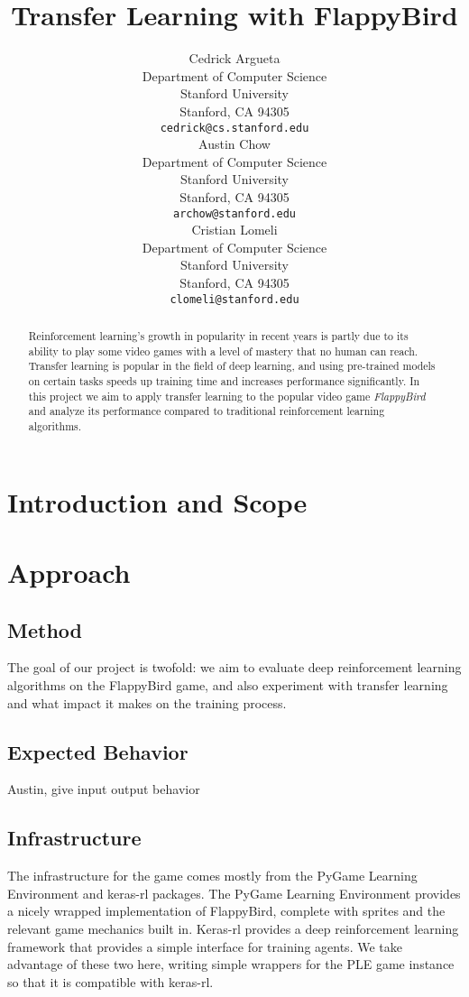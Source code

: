 \documentclass{article}
\title{Transfer Learning with FlappyBird}
\author{
  Cedrick Argueta \\%
  Department of Computer Science\\
  Stanford University\\
  Stanford, CA 94305 \\
  \texttt{cedrick@cs.stanford.edu} \\
  \And
  Austin Chow \\
  Department of Computer Science \\
  Stanford University\\
  Stanford, CA 94305 \\
  \texttt{archow@stanford.edu} \\
  \AND
  Cristian Lomeli\\
  Department of Computer Science \\
  Stanford University\\
  Stanford, CA 94305 \\
  \texttt{clomeli@stanford.edu} \\
}
\begin{document}

\maketitle

\begin{abstract}

Reinforcement learning's growth in popularity in recent years is partly due to its ability to play some video games with a level of mastery that no human can reach. Transfer learning is popular in the field of deep learning, and using pre-trained models on certain tasks speeds up training time and increases performance significantly. In this project we aim to apply transfer learning to the popular video game \textit{FlappyBird} and analyze its performance compared to traditional reinforcement learning algorithms.
 
\end{abstract}

\section{Introduction and Scope}

\section{Approach}

\subsection{Method}

The goal of our project is twofold: we aim to evaluate deep reinforcement learning algorithms on the FlappyBird game, and also experiment with transfer learning and what impact it makes on the training process. 

\subsection{Expected Behavior}

Austin, give input output behavior

\subsection{Infrastructure}

The infrastructure for the game comes mostly from the PyGame Learning Environment and keras-rl packages. The PyGame Learning Environment provides a nicely wrapped implementation of FlappyBird, complete with sprites and the relevant game mechanics built in. Keras-rl provides a deep reinforcement learning framework that provides a simple interface for training agents. We take advantage of these two here, writing simple wrappers for the PLE game instance so that it is compatible with keras-rl.
\end{document}

